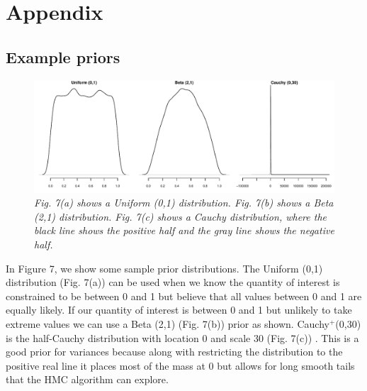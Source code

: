 \documentclass{article}
\begin{document}
\newpage
\section{Appendix}
\subsection*{Example priors}
\begin{figure}[H]
\centering
\includegraphics[width=\textwidth, height=\textheight, keepaspectratio]{prior_plot.pdf}
\caption{\emph{Fig. 7(a) shows a Uniform (0,1) distribution. Fig. 7(b) shows a Beta (2,1) distribution. Fig. 7(c) shows a Cauchy distribution, where the black line shows the positive half and the gray line shows the negative half.}}
\end{figure}
In Figure 7, we show some sample prior distributions. The Uniform (0,1) distribution (Fig. 7(a)) can be used when we know the quantity of interest is constrained to be between 0 and 1 but believe that all values between 0 and 1 are equally likely. If our quantity of interest is between 0 and 1 but unlikely to take extreme values we can use a Beta (2,1) (Fig. 7(b))  prior as shown.  Cauchy$^{+}$(0,30) is the half-Cauchy distribution with location 0 and scale 30 (Fig. 7(c)) . This is a good prior for variances because along with restricting the distribution to the positive real line it places most of the mass at 0 but allows for long smooth tails that the HMC algorithm can explore. 
\end{document}
